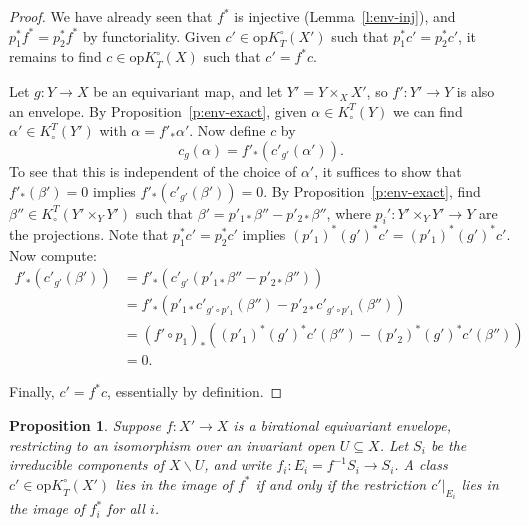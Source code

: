\documentclass[11pt]{amsart}
\newtheorem{proposition}[theorem]{Proposition}
\theoremstyle{definition}
\begin{document}
\begin{proof}
We have already seen that $f^*$ is injective (Lemma~\ref{l:env-inj}), and $p_1^*f^*=p_2^*f^*$ by functoriality.  Given $c'\in {\mathrm{op}K}_T^\circ(X')$ such that $p_1^*c'=p_2^*c'$, it remains to find $c\in{\mathrm{op}K}_T^\circ(X)$ such that $c' = f^*c$.

Let $g\colon Y \to X$ be an equivariant map, and let $Y' = Y \times_X X'$, so $f'\colon Y' \to Y$ is also an envelope.  By Proposition~\ref{p:env-exact}, given $\alpha\in K^T_\circ(Y)$ we can find $\alpha'\in K^T_\circ(Y')$ with $\alpha=f'_*\alpha'$.  Now define $c$ by
\[
  c_g(\alpha) = f'_*(c'_{g'} (\alpha') ).
\]
To see that this is independent of the choice of $\alpha'$, it suffices to show that $f'_*(\beta') = 0$ implies $f'_*(c'_{g'}(\beta'))=0$.  By Proposition~\ref{p:env-exact}, find $\beta'' \in K^T_\circ(Y'\times_Y Y')$ such that $\beta' = p'_{1*}\beta'' - p'_{2*}\beta''$, where $p_i'\colon Y'\times_Y Y' \to Y$ are the projections.  Note that $p_1^*c'=p_2^*c'$ implies $(p'_1)^*(g')^*c' = (p'_1)^*(g')^*c'$.  Now compute:
\begin{align*}
  f'_*(c'_{g'}(\beta')) &= f'_*(c'_{g'}(p'_{1*}\beta'' - p'_{2*}\beta'')) \\
                        &= f'_*(p'_{1*}c'_{g'\circ p'_1}(\beta'') - p'_{2*}c'_{g'\circ p'_1}(\beta'')) \\
                        &= (f'\circ p_1)_*( (p'_1)^*(g')^*c'(\beta'') - (p'_2)^*(g')^*c'(\beta'') ) \\
                        &= 0.
\end{align*}

Finally, $c' = f^*c$, essentially by definition.  
\end{proof}

\begin{proposition}\label{p:kim2}
Suppose $f\colon X' \to X$ is a birational equivariant envelope, restricting to an isomorphism over an invariant open $U\subseteq X$.  Let $S_i$ be the irreducible components of $X{\smallsetminus} U$, and write $f_i\colon E_i = f^{-1}S_i \to S_i$.  A class $c'\in {\mathrm{op}K}_T^\circ(X')$ lies in the image of $f^*$ if and only if the restriction $c'|_{E_i}$ lies in the image of $f_i^*$ for all $i$.
\end{proposition}
\end{document}
